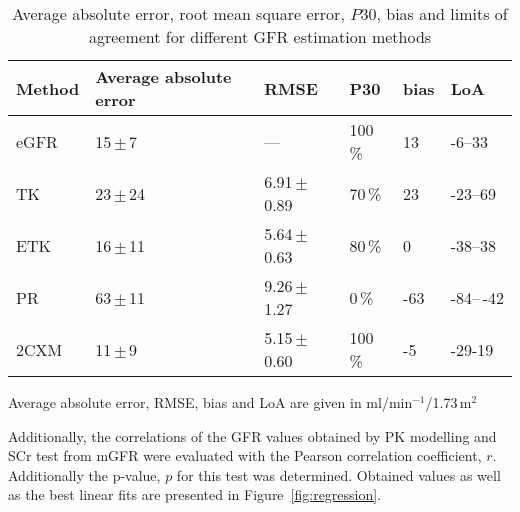 \begin{table}[H]
\centering
\caption[Comparison of different GFR estimation methods]{Average absolute error, root mean square error, $P30$, bias and limits of agreement for different GFR estimation methods} 
\label{tab:results2}
\begin{threeparttable}
\renewcommand{\arraystretch}{1.5}
\begin{tabular}{l R{2.5cm} R{2.5cm}  R{2cm} R{2cm} R{2cm}}
	\toprule

	\textbf{Method} & \textbf{Average absolute error}  & \textbf{RMSE}    & \textbf{P30}   & \textbf{bias} & \textbf{LoA} \\ \toprule
				eGFR  & 		15\,$\pm$\,7     		 	 & ---  				&	100\,\%      &  13  & -6--33 \\
				 TK   & 		23\,$\pm$\,24    			 & 6.91\,$\pm$\,0.89		        & 	70\,\%       & 23   &  -23--69 \\
				ETK   & 		16\,$\pm$\,11     			 & 5.64\,$\pm$\,0.63			        &	80\,\%       &0    & -38--38\\
				 PR   & 		63\,$\pm$\,11     			 & 9.26\,$\pm$\,1.27				        &	  0\,\%      & -63  & -84--\,-42\\
			    2CXM  & 		11\,$\pm$\,9     		     & 5.15\,$\pm$\,0.60				        &	  100\,\%      &  -5  & -29-19\\
				

  	\bottomrule

\end{tabular}
\begin{tablenotes}%
\footnotesize{}%
\item Average absolute error, RMSE, bias and LoA are given in ml/min$^{-1}$/1.73\,m$^2$
    \end{tablenotes}
	\end{threeparttable}
\end{table}


Additionally, the correlations of the GFR values obtained by PK modelling and SCr test from mGFR were evaluated with the Pearson correlation coefficient, $r$. Additionally the p-value, $p$ for this test was determined. Obtained values as well as the best linear fits are presented in Figure~\ref{fig:regression}.  
\newpage

